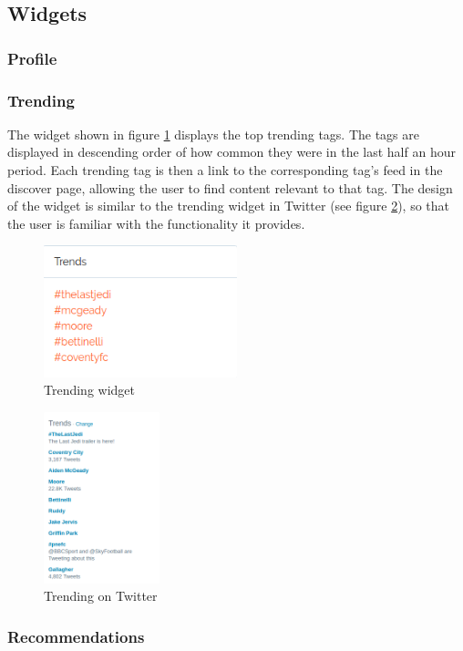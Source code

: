 \subsection{Widgets}

\subsubsection{Profile}

\subsubsection{Trending} \label{sec:design-trending}
The widget shown in figure \ref{fig:trending} displays the top trending tags. The tags are displayed in descending order of how common they were in the last half an hour period. Each trending tag is then a link to the corresponding tag's feed in the discover page, allowing the user to find content relevant to that tag. The design of the widget is similar to the trending widget in Twitter (see figure \ref{fig:trending-twitter}), so that the user is familiar with the functionality it provides.

\begin{figure}[H]
\centering
\includegraphics[width=0.5\textwidth]{Images/Design/trending-widget}
\caption{Trending widget}
\label{fig:trending}
\end{figure}

\begin{figure}[H]
\centering
\includegraphics[width=0.3\textwidth]{Images/Design/trending-twitter}
\caption{Trending on Twitter}
\label{fig:trending-twitter}
\end{figure}

\subsubsection{Recommendations}